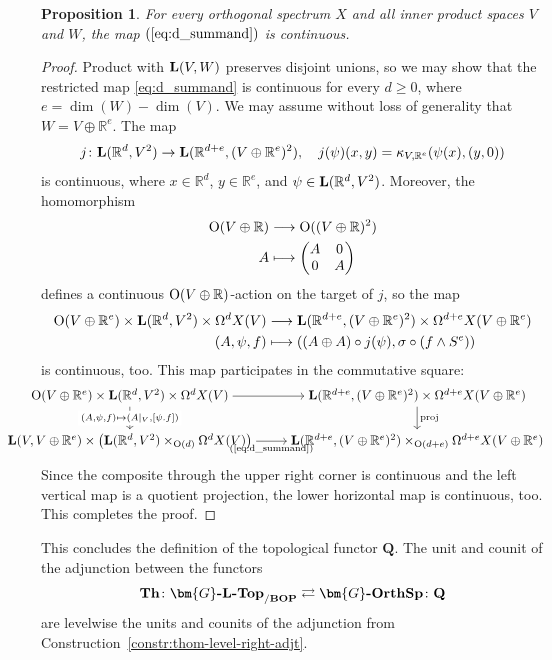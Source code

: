 \documentclass[reqno]{memo-l}
\theoremstyle{mythm}
\newtheorem{prop}[thm]{Proposition}
\theoremstyle{definition}
\numberwithin{equation}{section}
\newcommand{\cat}[1]{\textbf{\textup{#1}}}
\renewcommand{\O}{{\textup{O}}}
\let\smashp=\wedge
\newcommand{\Gosp}[1]{\cat{$\bm{#1}$-OrthSp}}
\newcommand{\Gospc}[1]{\cat{$\bm{#1}$-$\cat{L}$-Top}}
\newcommand{\BOP}{\cat{BOP}}
\begin{document}
\begin{prop}\label{prop:structure_continuous}
  For every orthogonal spectrum $X$ and all inner product spaces $V$ and $W$, the map $(\textup{\ref{eq:d_summand}})$ is continuous. 
\end{prop}
\begin{proof}
  Product with $\cat L(V,W)$ preserves disjoint unions, so we may show that the restricted map
  \eqref{eq:d_summand} is continuous for every $d\geq 0$, where $e=\dim(W)-\dim(V)$.
  We may assume without loss of generality that $W=V\oplus\mathbb R^e$.
  The map
  \[ j\colon\cat L(\mathbb R^d,V^2)\to \cat L(\mathbb R^{d+e},(V\oplus\mathbb R^e)^2),\quad
    j(\psi)(x,y)= \kappa_{V,\mathbb R^e}( \psi(x), (y,0)) \]
  is continuous, where $x\in\mathbb R^d$, $y\in\mathbb R^e$, and $\psi\in\cat L(\mathbb R^d,V^2)$. Moreover, the homomorphism \begin{align*}\O(V\oplus \mathbb R)&\longrightarrow\O((V\oplus \mathbb R)^{2})\\ A&\longmapsto \begin{pmatrix}
  A & 0 \\ 
  0 & A 
  \end{pmatrix}\end{align*} defines a continuous $\O(V\oplus\mathbb R)$-action on the target of $j$, so the map
  \begin{align*}
    \O(V\oplus\mathbb R^e)\times \cat L(\mathbb R^d,V^2)\times\Omega^dX(V)
    &\longrightarrow  \cat L(\mathbb R^{d+e},(V\oplus\mathbb R^e)^2)\times\Omega^{d+e}X(V\oplus\mathbb R^e)\\
    (A,\psi,f)&\longmapsto ((A\oplus A)\circ j(\psi),\sigma\circ(f\smashp S^e)) 
  \end{align*}
  is continuous, too. This map participates in the commutative square:
  \[\hskip-26.5pt\hfuzz=26.55pt
  \begin{tikzcd}[cramped]
      \O(V\oplus\mathbb R^e)\times \cat L(\mathbb R^d,V^2)\times\Omega^dX(V)
      \arrow[r]\arrow[d,"{(A,\psi,f)\mapsto (A|_V,[\psi.f])}"{description}]&
      \cat L(\mathbb R^{d+e},(V\oplus\mathbb R^e)^2)\times\Omega^{d+e}X(V\oplus\mathbb R^e)\arrow[d,"{\text{proj}}"]\\
      \cat L(V,V\oplus\mathbb R^e)\times \left( \cat L(\mathbb R^d,V^2)\times_{\O(d)}\Omega^dX(V)\right) 
      \arrow[r,"(\text{\ref{eq:d_summand}})"'] &
      \cat L(\mathbb R^{d+e},(V\oplus\mathbb R^e)^2)\times_{\O(d+e)}\Omega^{d+e}X(V\oplus\mathbb R^e)
     \end{tikzcd}
  \]
  Since the composite through the upper right corner
  is continuous and the left vertical map is a quotient projection,
  the lower horizontal map is continuous, too.
  This completes the proof.
\end{proof}
  This concludes the definition of the topological functor  $\textbf{Q}$.
  The unit and counit of the adjunction between the functors
  \[ \cat{Th}\colon \Gospc{G}_{/\BOP}\rightleftarrows \Gosp{G}\colon\textbf{Q}\]
  are levelwise the units and counits of the adjunction from Construction~\ref{constr:thom-level-right-adjt}. 
\end{document}

